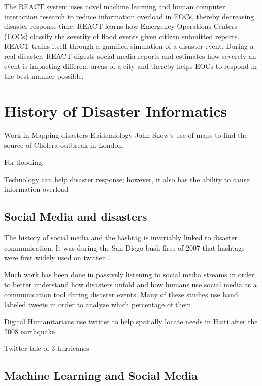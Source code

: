 The REACT system uses novel machine learning and human computer interaction
research to reduce information overload in EOCs, thereby decreasing disaster
response time. REACT learns how Emergency Operations Centers (EOCs) classify the
severity of flood events given citizen submitted reports. REACT trains itself
through a gamified simulation of a disaster event. During a real disaster, REACT
digests social media reports and estimates how severely an event is impacting
different areas of a city and thereby helps EOCs to respond in the best manner
possible.

\section{History of Disaster Informatics} Work in Mapping disasters Epidemiology
John Snow's use of maps to find the source of Cholera outbreak in
London\cite{rogersJohnSnowData2013}.

For flooding:~\cite{ahernGlobalHealthImpacts2005}

Technology can help disaster response; however, it also has the ability to cause
information overload\cite{tierneyFacingUnexpectedDisaster2001}


\subsection{Social Media and disasters}
The history of social media and the hashtag is invariably linked to disaster communication. 
It was during the San Diego bush fires of 2007 that hashtags were first widely
used on twitter~\cite{salazarHashtagsAnnotatedHistory2017}.


Much work has been done in passively listening to social media streams in order
to better understand how disasters unfold and how humans use social media as a
communication tool during disaster events. Many of these studies use hand
labeled tweets in order to analyze which percentage of them 

Digital Humanitarians use twitter to help spatially locate needs in Haiti
after the 2008 earthquake~\cite{meierDigitalHumanitariansHow2015}

Twitter tale of 3 hurricanes~\cite{alamTwitterTaleThree2018}

\subsection{Machine Learning and Social Media} 



